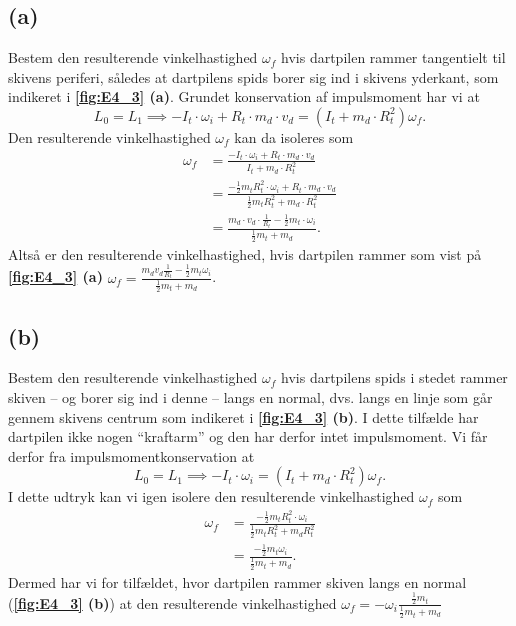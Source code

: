 \documentclass[12pt]{article}
\theoremstyle{definition}
\begin{document}
\subsection*{(a)}
Bestem den resulterende vinkelhastighed $\omega_f$ hvis dartpilen rammer tangentielt til skivens periferi, således at dartpilens spids borer sig ind i skivens yderkant, som indikeret i \textbf{\autoref{fig:E4_3} (a)}.
\bigbreak
Grundet konservation af impulsmoment har vi at
\[ 
L_0 = L_1 \implies -I_t \cdot \omega_i + R_t \cdot m_d \cdot v_d = (I_t + m_d \cdot R_t^2)\omega_f
.\]
Den resulterende vinkelhastighed $\omega_f$ kan da isoleres som
\begin{align*}
  \omega_f &= \frac{-I_t \cdot \omega_i + R_t \cdot m_d \cdot v_d}{I_t + m_d \cdot R_t^2} \\
  &= \frac{-\frac{1}{2}m_t R_t^2 \cdot \omega_i + R_t \cdot m_d \cdot v_d}{\frac{1}{2}m_t R_t^2 + m_d \cdot R_t^2} \\
  &= \frac{m_d \cdot v_d \cdot \frac{1}{R_t} - \frac{1}{2}m_t \cdot \omega_i}{\frac{1}{2}m_t + m_d}
.\end{align*}
Altså er den resulterende vinkelhastighed, hvis dartpilen rammer som vist på \textbf{\autoref{fig:E4_3} (a)} \underline{\underline{$\omega_f = \frac{m_dv_d \frac{1}{R_t} - \frac{1}{2}m_t\omega_i}{\frac{1}{2}m_t + m_d}$}}.


\subsection*{(b)}
Bestem den resulterende vinkelhastighed $\omega_f$ hvis dartpilens spids i stedet rammer skiven -- og borer sig ind i denne -- langs en normal, dvs. langs en linje som går gennem skivens centrum som indikeret i \textbf{\autoref{fig:E4_3} (b)}.
\bigbreak
I dette tilfælde har dartpilen ikke nogen ``kraftarm'' og den har derfor intet impulsmoment. Vi får derfor fra impulsmomentkonservation at
\[ 
L_0 = L_1 \implies -I_t \cdot \omega_i = \left( I_t + m_d \cdot R_t^2 \right)\omega_f
.\]
I dette udtryk kan vi igen isolere den resulterende vinkelhastighed $\omega_f$ som
\begin{align*}
  \omega_f &= \frac{-\frac{1}{2}m_t R_t^2 \cdot \omega_i}{\frac{1}{2}m_t R_t^2 + m_d R_t^2} \\
  &= \frac{-\frac{1}{2}m_t\omega_i}{\frac{1}{2}m_t + m_d}
.\end{align*}
Dermed har vi for tilfældet, hvor dartpilen rammer skiven langs en normal (\textbf{\autoref{fig:E4_3} (b)}) at den resulterende vinkelhastighed \underline{\underline{$\omega_f = -\omega_i \frac{\frac{1}{2}m_t}{\frac{1}{2}m_t + m_d}$}}
\end{document}
